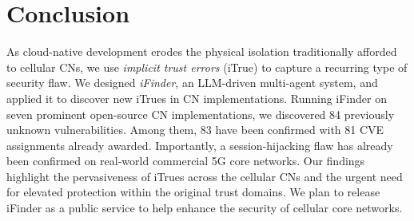 
\section{Conclusion}
As cloud-native development erodes the physical isolation traditionally afforded to cellular CNs, we use \textit{implicit trust errors} (iTrue) to capture a recurring type of security flaw. We designed \textit{iFinder}, an LLM-driven multi-agent system, and applied it to discover new iTrues in CN implementations. Running iFinder on seven prominent open-source CN implementations, we discovered 84 previously unknown vulnerabilities. Among them, 83 have been confirmed with 81 CVE assignments already awarded. Importantly, a session-hijacking flaw has already been confirmed on real-world commercial 5G core networks. Our findings highlight the pervasiveness of iTrues across the cellular CNs and the urgent need for elevated protection within the original trust domains. We plan to release iFinder as a public service to help enhance the security of cellular core networks.


